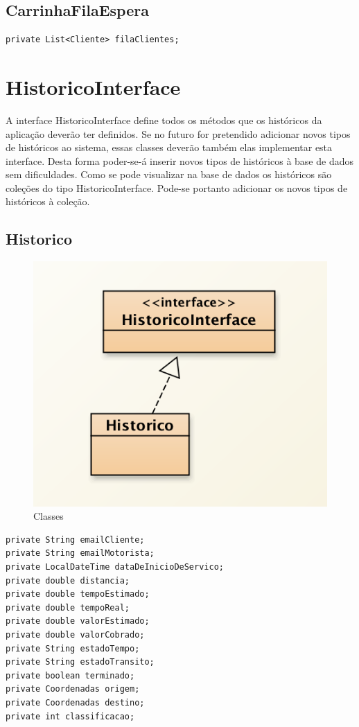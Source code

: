 \subsection{CarrinhaFilaEspera}
\begin{verbatim}
private List<Cliente> filaClientes;
\end{verbatim}

\newpage
\section{HistoricoInterface}
A interface HistoricoInterface define todos os métodos que os históricos da aplicação deverão ter definidos. 
Se no futuro for pretendido adicionar novos tipos de históricos ao sistema, essas classes deverão também elas implementar esta interface.  Desta forma poder-se-á inserir novos tipos de históricos à base de dados sem dificuldades. Como se pode visualizar na base de dados os históricos são coleções do tipo HistoricoInterface. Pode-se portanto adicionar os novos tipos de históricos à coleção. 

\subsection{Historico}
\begin{figure}[htpb]
	\centering
	\includegraphics[scale=0.6]{imagem/historico}
	\caption{Classes }
	\label{p2:fig:p2_historico}
\end{figure}
\begin{verbatim}
private String emailCliente; 
private String emailMotorista; 
private LocalDateTime dataDeInicioDeServico;
private double distancia;
private double tempoEstimado; 
private double tempoReal;
private double valorEstimado; 
private double valorCobrado; 
private String estadoTempo;
private String estadoTransito; 
private boolean terminado; 
private Coordenadas origem;
private Coordenadas destino;
private int classificacao;
\end{verbatim}


